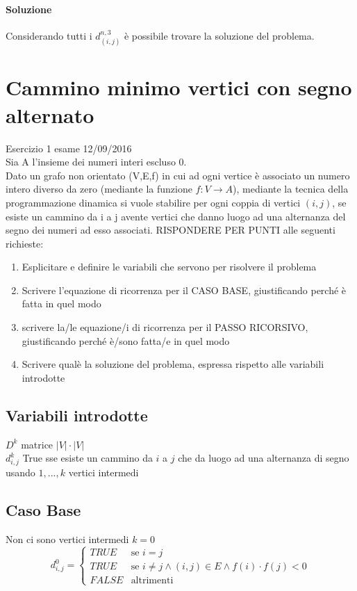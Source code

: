 \documentclass[12pt, a4paper, openany]{book}
\begin{document}
\paragraph*{Soluzione}
Considerando tutti i $d_{(i,j)}^{n,3}$ è possibile trovare la soluzione del problema.

\section{Cammino minimo vertici con segno alternato} Esercizio 1 esame 12/09/2016\\
Sia A l'insieme dei numeri interi escluso 0.\\
Dato un grafo non orientato (V,E,f) in cui ad ogni vertice è associato un numero intero
diverso da zero (mediante la funzione $f: V\rightarrow A$), mediante la tecnica della
programmazione dinamica si vuole stabilire per ogni coppia di vertici $(i,j)$, se esiste un
cammino da i a j avente vertici che danno luogo ad una alternanza del segno dei numeri
ad esso associati. RISPONDERE PER PUNTI alle seguenti richieste:
\begin{enumerate}
	\item Esplicitare e definire le variabili che servono per risolvere il problema
	\item Scrivere l'equazione di ricorrenza per il CASO BASE, giustificando perché è fatta in quel modo
	\item scrivere la/le equazione/i di ricorrenza per il PASSO RICORSIVO, giustificando perché è/sono fatta/e in quel modo
	\item Scrivere qualè la soluzione del problema, espressa rispetto alle variabili introdotte
\end{enumerate}

\subsection*{Variabili introdotte}
$D^k$ matrice $|V|\cdot|V|$
\\$d^k_{i,j}$ True sse esiste un cammino da $i$ a $j$ che da luogo ad una alternanza di segno usando ${1,...,k}$ vertici intermedi

	\subsection*{Caso Base} Non ci sono vertici intermedi $k=0$
	\begin{equation*}
		d^0_{i,j} = \begin{cases}
			TRUE  & \text{se $i=j$}                                                  \\
			TRUE  & \text{se $i\neq j \land (i,j) \in E \land f(i) \cdot f(j) < 0 $} \\
			FALSE & \text{altrimenti}
		\end{cases}
	\end{equation*}
\end{document}
